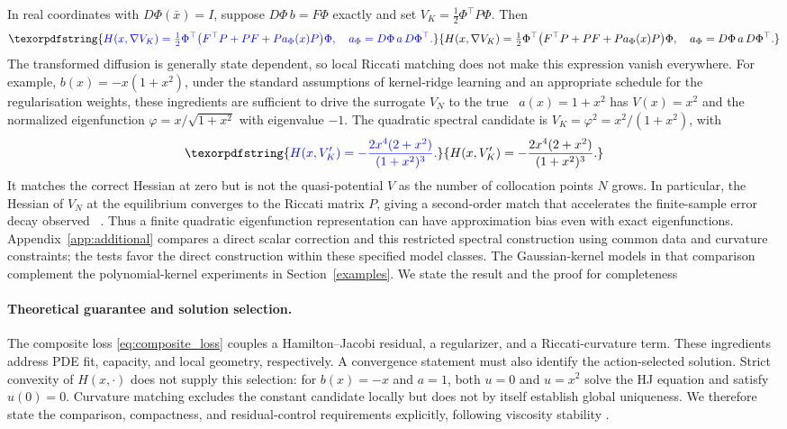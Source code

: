 \documentclass[11pt]{article}
\theoremstyle{plain}      %
\theoremstyle{definition} %
\providecommand{\DIFaddtex}[1]{{\protect\color{blue}#1}} %
\providecommand{\DIFdeltex}[1]{{\protect\color{red}#1}} %
\providecommand{\DIFaddbegin}{} %
\providecommand{\DIFaddend}{} %
\providecommand{\DIFdelbegin}{} %
\providecommand{\DIFdelend}{} %
\providecommand{\DIFadd}[1]{\texorpdfstring{\DIFaddtex{#1}}{#1}} %
\providecommand{\DIFdel}[1]{\texorpdfstring{\DIFdeltex{#1}}{}} %
\newcommand{\DIFscaledelfig}{1.0}
\newlength{\DIFdelgraphicswidth} %
\newlength{\DIFdelgraphicsheight} %
\newcommand{\DIFaddincludegraphics}[2][]{{\color{blue}\fbox{\DIFOincludegraphics[#1]{#2}}}} %
\newcommand{\DIFdelincludegraphics}[2][]{%
\sbox{\DIFdelgraphicsbox}{\DIFOincludegraphics[#1]{#2}}%
\settoboxwidth{\DIFdelgraphicswidth}{\DIFdelgraphicsbox} %
\settoboxtotalheight{\DIFdelgraphicsheight}{\DIFdelgraphicsbox} %
\scalebox{\DIFscaledelfig}{%
\parbox[b]{\DIFdelgraphicswidth}{\usebox{\DIFdelgraphicsbox}\\[-\baselineskip] \rule{\DIFdelgraphicswidth}{0em}}\llap{\resizebox{\DIFdelgraphicswidth}{\DIFdelgraphicsheight}{%
\setlength{\unitlength}{\DIFdelgraphicswidth}%
\begin{picture}(1,1)%
\thicklines\linethickness{2pt} %
{\color[rgb]{1,0,0}\put(0,0){\framebox(1,1){}}}%
{\color[rgb]{1,0,0}\put(0,0){\line( 1,1){1}}}%
{\color[rgb]{1,0,0}\put(0,1){\line(1,-1){1}}}%
\end{picture}%
}\hspace*{3pt}}} %
} %
\DeclareRobustCommand{\DIFaddbegin}{\DIFOaddbegin \let\includegraphics\DIFaddincludegraphics} %
\DeclareRobustCommand{\DIFaddend}{\DIFOaddend \let\includegraphics\DIFOincludegraphics} %
\DeclareRobustCommand{\DIFdelbegin}{\DIFOdelbegin \let\includegraphics\DIFdelincludegraphics} %
\DeclareRobustCommand{\DIFdelend}{\DIFOaddend \let\includegraphics\DIFOincludegraphics} %
\begin{document}
\DIFadd{In real coordinates with $D\Phi(\bar x)=I$, suppose $D\Phi\,b=F\Phi$ exactly and set $V_K=\tfrac12\Phi^\top P\Phi$. Then
}\begin{equation}\DIFadd{\label{eq:transformed-diffusion}
 H(x,\nabla V_K)=\tfrac12\Phi^\top
 \bigl(F^\top P+PF+P a_\Phi(x)P\bigr)\Phi,
 \quad a_\Phi=D\Phi\,a\,D\Phi^\top.
}\end{equation}
\DIFadd{The transformed diffusion is generally state dependent, so local Riccati matching does not make this expression vanish everywhere. For example, $b(x)=-x(1+x^2)$}\DIFaddend , \DIFdelbegin \DIFdel{under the
standard assumptions of kernel‐ridge learning and an appropriate schedule
for the regularisation weights, these ingredients are sufficient to drive
the surrogate \(V_{N}\) to the true }\DIFdelend\ \DIFaddbegin \DIFadd{$a(x)=1+x^2$ has $V(x)=x^2$ and the normalized eigenfunction $\varphi=x/\sqrt{1+x^2}$ with eigenvalue $-1$. The quadratic spectral candidate is $V_K=\varphi^2=x^2/(1+x^2)$, with
}\[
 \DIFadd{H(x,V_K')=-\frac{2x^4(2+x^2)}{(1+x^2)^3}.
}\]
\DIFadd{It matches the correct Hessian at zero but is not the }\DIFaddend quasi-potential \DIFdelbegin \DIFdel{\(V\) as the number of
collocation points \(N\) grows. In particular, the Hessian of \(V_{N}\)
at the equilibrium converges to the Riccati matrix \(P\), giving a second-order match that accelerates the finite-sample error decay observed
}\DIFdelend\ \DIFaddbegin \DIFadd{. Thus a finite quadratic eigenfunction representation can have approximation bias even with exact eigenfunctions. Appendix~\ref{app:additional} compares a direct scalar correction and this restricted spectral construction using common data and curvature constraints; the tests favor the direct construction within these specified model classes. The Gaussian-kernel models in that comparison complement the polynomial-kernel experiments }\DIFaddend in Section~\ref{examples}.
\DIFdelbegin \DIFdel{We state the result and the proof for completeness}\DIFdelend \DIFaddbegin 

\paragraph{\DIFadd{Theoretical guarantee and solution selection.}}\label{sec:solution-selection}
\DIFadd{The composite loss \eqref{eq:composite_loss} couples a Hamilton--Jacobi residual, a regularizer, and a Riccati-curvature term. These ingredients address PDE fit, capacity, and local geometry, respectively. A convergence statement must also identify the action-selected solution. Strict convexity of $H(x,\cdot)$ does not supply this selection: for $b(x)=-x$ and $a=1$, both $u=0$ and $u=x^2$ solve the HJ equation and satisfy $u(0)=0$. Curvature matching excludes the constant candidate locally but does not by itself establish global uniqueness. We therefore state the comparison, compactness, and residual-control requirements explicitly, following viscosity stability \cite{Crandall1992}}\DIFaddend .
\end{document}
